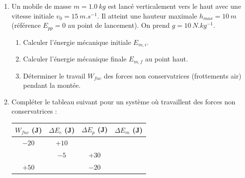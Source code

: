 \documentclass[11pt]{article}
\begin{document}
\begin{exercice}
\begin{enumerate}
    \item Un mobile de masse $m = \SI{1,0}{kg}$ est lancé verticalement vers le haut avec une vitesse initiale $v_0 = \SI{15}{m.s^{-1}}$. Il atteint une hauteur maximale $h_{max} = \SI{10}{m}$ (référence $E_{pp}=0$ au point de lancement). On prend $g = \SI{10}{N.kg^{-1}}$.
    \begin{enumerate}
        \item Calculer l'énergie mécanique initiale $E_{m,i}$.
        \item Calculer l'énergie mécanique finale $E_{m,f}$ au point haut.
        \item Déterminer le travail $W_{fnc}$ des forces non conservatrices (frottements air) pendant la montée.
    \end{enumerate}
    \item Compléter le tableau suivant pour un système où travaillent des forces non conservatrices :
    \begin{center}
    \begin{tabular}{|c|c|c|c|}
    \hline
    $W_{fnc}$ (J) & $\Delta E_c$ (J) & $\Delta E_p$ (J) & $\Delta E_m$ (J) \\
    \hline
    $-20$ & $+10$ &  &  \\
    \hline
    & $-5$ & $+30$ &  \\
    \hline
    $+50$ &  & $-20$ &  \\
    \hline
    \end{tabular}
    \end{center}
\end{enumerate}
\end{exercice}
\end{document}
